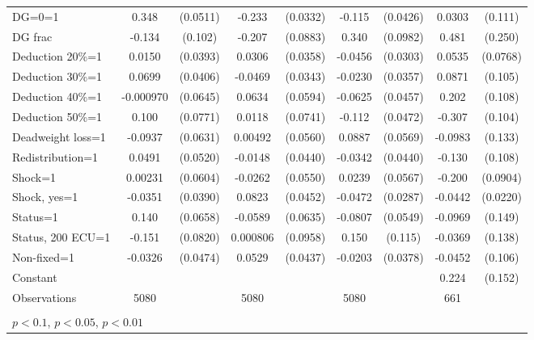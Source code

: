 \begin{tabular}{l|cccccc|cc}
DG=0=1          &    0.348\sym{***}& (0.0511)&   -0.233\sym{***}& (0.0332)&   -0.115\sym{***}& (0.0426)&   0.0303         &  (0.111)\\
DG frac         &   -0.134         &  (0.102)&   -0.207\sym{**} & (0.0883)&    0.340\sym{***}& (0.0982)&    0.481\sym{*}  &  (0.250)\\
Deduction 20\%=1&   0.0150         & (0.0393)&   0.0306         & (0.0358)&  -0.0456         & (0.0303)&   0.0535         & (0.0768)\\
Deduction 30\%=1&   0.0699\sym{*}  & (0.0406)&  -0.0469         & (0.0343)&  -0.0230         & (0.0357)&   0.0871         &  (0.105)\\
Deduction 40\%=1&-0.000970         & (0.0645)&   0.0634         & (0.0594)&  -0.0625         & (0.0457)&    0.202\sym{*}  &  (0.108)\\
Deduction 50\%=1&    0.100         & (0.0771)&   0.0118         & (0.0741)&   -0.112\sym{**} & (0.0472)&   -0.307\sym{***}&  (0.104)\\
Deadweight loss=1&  -0.0937         & (0.0631)&  0.00492         & (0.0560)&   0.0887         & (0.0569)&  -0.0983         &  (0.133)\\
Redistribution=1&   0.0491         & (0.0520)&  -0.0148         & (0.0440)&  -0.0342         & (0.0440)&   -0.130         &  (0.108)\\
Shock=1         &  0.00231         & (0.0604)&  -0.0262         & (0.0550)&   0.0239         & (0.0567)&   -0.200\sym{**} & (0.0904)\\
Shock, yes=1    &  -0.0351         & (0.0390)&   0.0823\sym{*}  & (0.0452)&  -0.0472         & (0.0287)&  -0.0442\sym{**} & (0.0220)\\
Status=1        &    0.140\sym{**} & (0.0658)&  -0.0589         & (0.0635)&  -0.0807         & (0.0549)&  -0.0969         &  (0.149)\\
Status, 200 ECU=1&   -0.151\sym{*}  & (0.0820)& 0.000806         & (0.0958)&    0.150         &  (0.115)&  -0.0369         &  (0.138)\\
Non-fixed=1     &  -0.0326         & (0.0474)&   0.0529         & (0.0437)&  -0.0203         & (0.0378)&  -0.0452         &  (0.106)\\
Constant        &                  &         &                  &         &                  &         &    0.224         &  (0.152)\\
\hline
Observations    &     5080         &         &     5080         &         &     5080         &         &      661         &         \\
\hline\hline
\multicolumn{9}{p{16cm}}{\tiny }\\
\multicolumn{9}{l}{\tiny \sym{*} \(p<0.1\), \sym{**} \(p<0.05\), \sym{***} \(p<0.01\)}\\
\end{tabular}